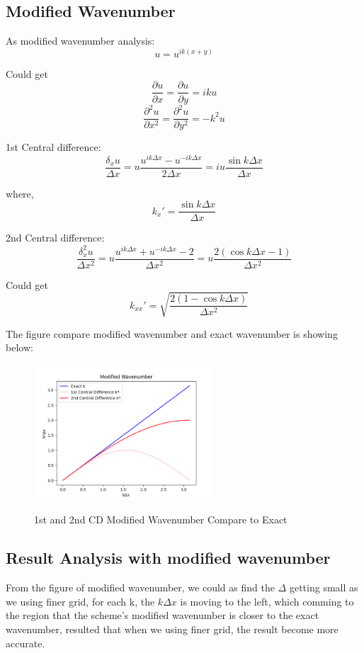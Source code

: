 \documentclass[12pt]{article}
\begin{document}
\subsection{Modified Wavenumber}
As modified wavenumber analysis:
$$
u = u^{ik(x+y)} 
$$

Could get
$$
\frac{\partial u}{\partial x} 
= \frac{\partial u}{\partial y} = iku 
$$
$$
\frac{\partial^2 u}{\partial x^2} 
= \frac{\partial^2 u}{\partial y^2} = -k^2u 
$$


1st Central difference:
$$
\frac{\delta_x u}{\Delta x} = u\frac{u^{ik\Delta x}-u^{-ik\Delta x}}{2\Delta x} = iu\frac{\sin k\Delta x}{\Delta x} 
$$

where,
$$
k_x' = \frac{\sin k \Delta x}{\Delta x}
$$

2nd Central difference:
$$
\frac{\delta_x^2 u}{\Delta x^2} = u\frac{u^{ik\Delta x}+u^{-ik\Delta x}-2}{\Delta x^2} = u\frac{2(\cos k\Delta x-1)}{\Delta x^2} 
$$

Could get 
$$
\quad k_{xx} '= \sqrt{\frac{2(1-\cos k\Delta x)}{\Delta x^2}}
$$



The figure compare modified wavenumber and exact wavenumber
is showing below:


\begin{figure}[H]
    \centering
    \includegraphics[width=0.6\textwidth]{figuresGeneral/Midified_Wavenumber.png}
    \label{IGs.jpg}
    \caption{1st and 2nd CD Modified Wavenumber Compare to Exact }
\end{figure}


\subsection{Result Analysis with modified wavenumber}


From the figure of modified wavenumber,
we could as find the $\Delta$ getting small as we using finer 
grid, for each k, the $k\Delta x$ is moving to the left, which comming 
to the region that the scheme's modified wavenumber is closer 
to the exact wavenumber, resulted that when we using finer grid, 
the result become more accurate. \\
\end{document}
